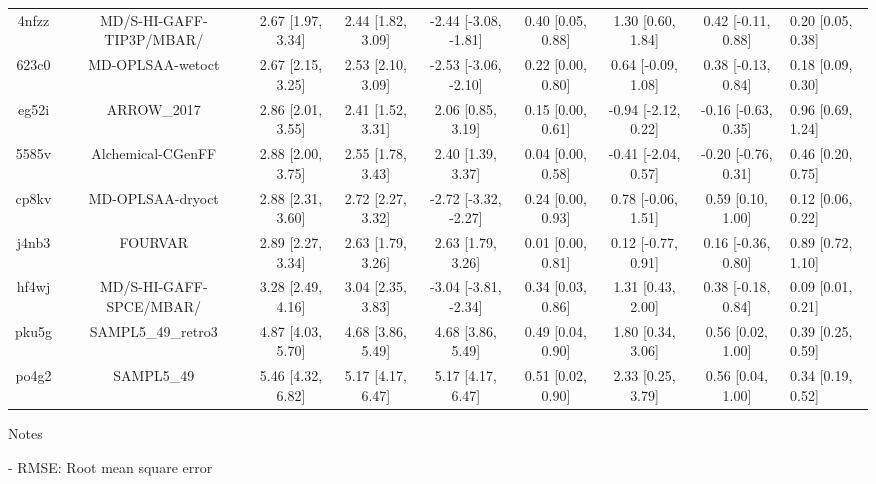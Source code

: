 \documentclass{article}
\begin{document}
\begin{center}
\begin{longtable}{|cccccccc|}
 4nfzz &                           MD/S-HI-GAFF-TIP3P/MBAR/ &  2.67 [1.97, 3.34] &  2.44 [1.82, 3.09] &  -2.44 [-3.08, -1.81] &  0.40 [0.05, 0.88] &    1.30 [0.60, 1.84] &   0.42 [-0.11, 0.88] &     0.20 [0.05, 0.38] \\
 623c0 &                                   MD-OPLSAA-wetoct &  2.67 [2.15, 3.25] &  2.53 [2.10, 3.09] &  -2.53 [-3.06, -2.10] &  0.22 [0.00, 0.80] &   0.64 [-0.09, 1.08] &   0.38 [-0.13, 0.84] &     0.18 [0.09, 0.30] \\
 eg52i &                                        ARROW\_2017 &  2.86 [2.01, 3.55] &  2.41 [1.52, 3.31] &     2.06 [0.85, 3.19] &  0.15 [0.00, 0.61] &  -0.94 [-2.12, 0.22] &  -0.16 [-0.63, 0.35] &     0.96 [0.69, 1.24] \\
 5585v &                                  Alchemical-CGenFF &  2.88 [2.00, 3.75] &  2.55 [1.78, 3.43] &     2.40 [1.39, 3.37] &  0.04 [0.00, 0.58] &  -0.41 [-2.04, 0.57] &  -0.20 [-0.76, 0.31] &     0.46 [0.20, 0.75] \\
 cp8kv &                                   MD-OPLSAA-dryoct &  2.88 [2.31, 3.60] &  2.72 [2.27, 3.32] &  -2.72 [-3.32, -2.27] &  0.24 [0.00, 0.93] &   0.78 [-0.06, 1.51] &    0.59 [0.10, 1.00] &     0.12 [0.06, 0.22] \\
 j4nb3 &                                            FOURVAR &  2.89 [2.27, 3.34] &  2.63 [1.79, 3.26] &     2.63 [1.79, 3.26] &  0.01 [0.00, 0.81] &   0.12 [-0.77, 0.91] &   0.16 [-0.36, 0.80] &     0.89 [0.72, 1.10] \\
 hf4wj &                            MD/S-HI-GAFF-SPCE/MBAR/ &  3.28 [2.49, 4.16] &  3.04 [2.35, 3.83] &  -3.04 [-3.81, -2.34] &  0.34 [0.03, 0.86] &    1.31 [0.43, 2.00] &   0.38 [-0.18, 0.84] &     0.09 [0.01, 0.21] \\
 pku5g &                                 SAMPL5\_49\_retro3 &  4.87 [4.03, 5.70] &  4.68 [3.86, 5.49] &     4.68 [3.86, 5.49] &  0.49 [0.04, 0.90] &    1.80 [0.34, 3.06] &    0.56 [0.02, 1.00] &     0.39 [0.25, 0.59] \\
 po4g2 &                                         SAMPL5\_49 &  5.46 [4.32, 6.82] &  5.17 [4.17, 6.47] &     5.17 [4.17, 6.47] &  0.51 [0.02, 0.90] &    2.33 [0.25, 3.79] &    0.56 [0.04, 1.00] &     0.34 [0.19, 0.52] \\
\end{longtable}
\end{center}

Notes

- RMSE: Root mean square error
\end{document}
